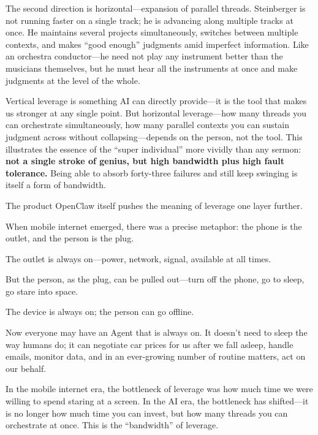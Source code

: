 \vspace{1em}

\newpage
The second direction is horizontal---expansion of parallel threads. Steinberger is not running faster on a single track; he is advancing along multiple tracks at once. He maintains several projects simultaneously, switches between multiple contexts, and makes ``good enough'' judgments amid imperfect information. Like an orchestra conductor---he need not play any instrument better than the musicians themselves, but he must hear all the instruments at once and make judgments at the level of the whole.

\vspace{1em}

Vertical leverage is something AI can directly provide---it is the tool that makes us stronger at any single point. But horizontal leverage---how many threads you can orchestrate simultaneously, how many parallel contexts you can sustain judgment across without collapsing---depends on the person, not the tool. This illustrates the essence of the ``super individual'' more vividly than any sermon: \textbf{not a single stroke of genius, but high bandwidth plus high fault tolerance.} Being able to absorb forty-three failures and still keep swinging is itself a form of bandwidth.

\vspace{1em}

The product OpenClaw itself pushes the meaning of leverage one layer further.

When mobile internet emerged, there was a precise metaphor: the phone is the outlet, and the person is the plug.

The outlet is always on---power, network, signal, available at all times.

But the person, as the plug, can be pulled out---turn off the phone, go to sleep, go stare into space.

The device is always on; the person can go offline.

\vspace{1em}

Now everyone may have an Agent that is always on. It doesn't need to sleep the way humans do; it can negotiate car prices for us after we fall asleep, handle emails, monitor data, and in an ever-growing number of routine matters, act on our behalf.

\vspace{1em}

In the mobile internet era, the bottleneck of leverage was how much time we were willing to spend staring at a screen. In the AI era, the bottleneck has shifted---it is no longer how much time you can invest, but how many threads you can orchestrate at once. This is the ``bandwidth'' of leverage.

